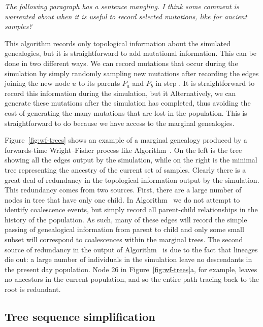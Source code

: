 \documentclass{article}
\newcommand{\krt}[1]{{\em \color{green} #1}}
\begin{document}
\krt{The following paragraph has a sentence mangling.  I think some comment is warrented about when it is useful to
record selected mutations, like for ancient samples?}

This algorithm records only topological information about the simulated genealogies,
but it is straightforward to add mutational information.
This can be done in two different ways.
We can record mutations that occur during the simulation by simply
randomly sampling new mutations after recording the edges joining the new node $u$ to its parents
$P_a$ and $P_b$ in step .
It is straightforward to record this information during the simulation, but it
Alternatively, we can generate these mutations after the simulation has completed, thus
avoiding the cost of generating the many mutations that are lost in the population.
This is straightforward to do because we have access to the marginal genealogies.

Figure~\ref{fig:wf-trees} shows
an example of a marginal genealogy produced by a forwards-time Wright--Fisher
process like Algorithm~.
On the left is the tree showing all the edges output by the simulation,
while on the right
is the minimal tree representing the ancestry of the current set of samples.
Clearly there is a great deal of redundancy in the topological
information output by the simulation.
This redundancy comes from two sources.
First, there are a large number of nodes in tree that have only one child.
In Algorithm~ we do not attempt to identify coalescence events,
but simply record all parent-child
relationships in the history of the population.
As such, many of these edges
will record the simple passing of genealogical information from parent to child
and only some small subset will correspond to coalescences within the marginal
trees. The second source of redundancy in the output of Algorithm~
is due to the fact that lineages die out: a large number of
individuals in the simulation leave no descendants in the present day population.
Node 26 in Figure~\ref{fig:wf-trees}a, for example, leaves no
ancestors in the current population, and so the entire path tracing back to
the root is redundant.

\subsection*{Tree sequence simplification}
\label{ss:simplify}
\end{document}
